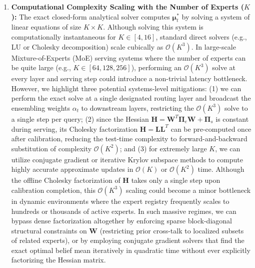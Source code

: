 \documentclass{article}
\theoremstyle{plain}
\theoremstyle{definition}
\theoremstyle{remark}
\begin{document}
\begin{enumerate}
    \item \textbf{Computational Complexity Scaling with the Number of Experts ($K$):} The exact closed-form analytical solver computes $\mathbf{\mu}_t^*$ by solving a system of linear equations of size $K \times K$. Although solving this system is computationally instantaneous for $K \in [4, 16]$, standard direct solvers (e.g., LU or Cholesky decomposition) scale cubically as $\mathcal{O}(K^3)$. In large-scale Mixture-of-Experts (MoE) serving systems where the number of experts can be quite large (e.g., $K \in [64, 128, 256]$), performing an $\mathcal{O}(K^3)$ solve at every layer and serving step could introduce a non-trivial latency bottleneck. However, we highlight three potential systems-level mitigations: (1) we can perform the exact solve at a single designated routing layer and broadcast the ensembling weights $\alpha_t$ to downstream layers, restricting the $\mathcal{O}(K^3)$ solve to a single step per query; (2) since the Hessian $\mathbf{H} = \mathbf{W}^T\mathbf{\Pi}_e\mathbf{W} + \mathbf{\Pi}_s$ is constant during serving, its Cholesky factorization $\mathbf{H} = \mathbf{L}\mathbf{L}^T$ can be pre-computed once after calibration, reducing the test-time complexity to forward-and-backward substitution of complexity $\mathcal{O}(K^2)$; and (3) for extremely large $K$, we can utilize conjugate gradient or iterative Krylov subspace methods to compute highly accurate approximate updates in $\mathcal{O}(K)$ or $\mathcal{O}(K^2)$ time. Although the offline Cholesky factorization of $\mathbf{H}$ takes only a single step upon calibration completion, this $\mathcal{O}(K^3)$ scaling could become a minor bottleneck in dynamic environments where the expert registry frequently scales to hundreds or thousands of active experts. In such massive regimes, we can bypass dense factorization altogether by enforcing sparse block-diagonal structural constraints on $\mathbf{W}$ (restricting prior cross-talk to localized subsets of related experts), or by employing conjugate gradient solvers that find the exact optimal belief mean iteratively in quadratic time without ever explicitly factorizing the Hessian matrix.


\end{enumerate}
\end{document}
